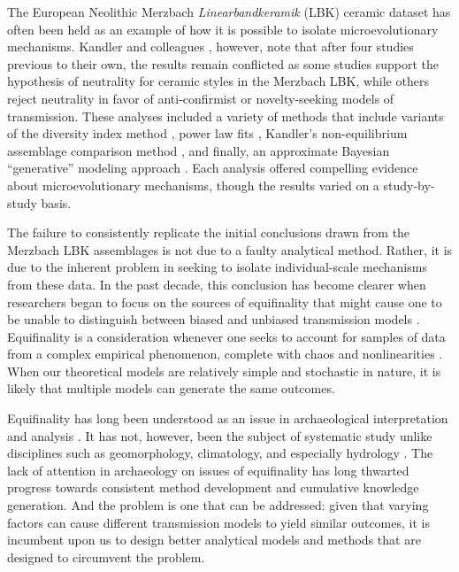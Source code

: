 The European Neolithic Merzbach \emph{Linearbandkeramik} (LBK) ceramic dataset has often been held as an example of how it is possible to isolate microevolutionary mechanisms. Kandler and colleagues \citeyearpar{Kandler20150905}, however, note that after four studies previous to their own, the results remain conflicted as some studies support the hypothesis of neutrality for ceramic styles in the Merzbach LBK, while others reject neutrality in favor of anti-confirmist or novelty-seeking models of transmission.  These analyses included a variety of methods that include variants of the diversity index method \citep{Shennan2001ceramic,shennan2008style}, power law fits \citep{Bentley2003,shennan2008style}, Kandler's non-equilibrium assemblage comparison method \citep{Kandler2013}, and finally, an approximate Bayesian ``generative'' modeling approach \citep{Kandler20150905}.  Each analysis offered compelling evidence about microevolutionary mechanisms, though the results varied on a study-by-study basis.  

The failure to consistently replicate the initial conclusions drawn from the Merzbach LBK assemblages is not due to a faulty analytical method.  Rather, it is due to the inherent problem in seeking to isolate individual-scale mechanisms from these data.  In the past decade, this conclusion has become clearer when researchers began to focus on the sources of equifinality that might cause one to be unable to distinguish between biased and unbiased transmission models \citep{premo2010equifinality}.  Equifinality is a consideration whenever one seeks to account for samples of data from a complex empirical phenomenon, complete with chaos and nonlinearities \citep{bertalanffy1969general}.  When our theoretical models are relatively simple and stochastic in nature, it is likely that multiple models can generate the same outcomes.  

Equifinality has long been understood as an issue in archaeological interpretation and analysis .  It has not, however, been the subject of systematic study unlike disciplines such as geomorphology, climatology, and especially  hydrology  .  The lack of attention in archaeology on issues of equifinality has long thwarted progress towards consistent method development and cumulative knowledge generation.  And the problem is one that can be addressed:  given that varying factors can cause different transmission models to yield similar outcomes, it is incumbent upon us to design better analytical models and methods that are designed to circumvent the problem.  

